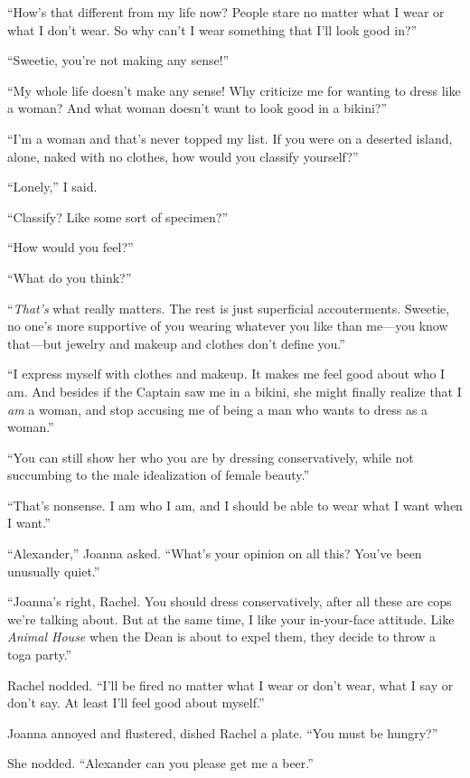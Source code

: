 ``How's that different from my life now? People stare no matter what I
wear or what I don't wear. So why can't I wear something that I'll look
good in?''

``Sweetie, you're not making any sense!''

``My whole life doesn't make any sense! Why criticize me for wanting to
dress like a woman? And what woman doesn't want to look good in a
bikini?''

``I'm a woman and that's never topped my list. If you were on a deserted
island, alone, naked with no clothes, how would you classify yourself?''

``Lonely,'' I said.

``Classify? Like some sort of specimen?''

``How would you feel?''

``What do you think?''

``\emph{That's} what really matters. The rest is just superficial
accouterments. Sweetie, no one's more supportive of you wearing whatever
you like than me---you know that---but jewelry and makeup and clothes
don't define you.''

``I express myself with clothes and makeup. It makes me feel good about
who I am. And besides if the Captain saw me in a bikini, she might
finally realize that I \emph{am} a woman, and stop accusing me of being
a man who wants to dress as a woman.''

``You can still show her who you are by dressing conservatively, while
not succumbing to the male idealization of female beauty.''

``That's nonsense. I am who I am, and I should be able to wear what I
want when I want.''

``Alexander,'' Joanna asked. ``What's your opinion on all this? You've
been unusually quiet.''

``Joanna's right, Rachel. You should dress conservatively, after all
these are cops we're talking about. But at the same time, I like your
in-your-face attitude. Like \emph{Animal House} when the Dean is about
to expel them, they decide to throw a toga party.''

Rachel nodded. ``I'll be fired no matter what I wear or don't wear, what
I say or don't say. At least I'll feel good about myself.''

Joanna annoyed and flustered, dished Rachel a plate. ``You must be
hungry?''

She nodded. ``Alexander can you please get me a beer.''

